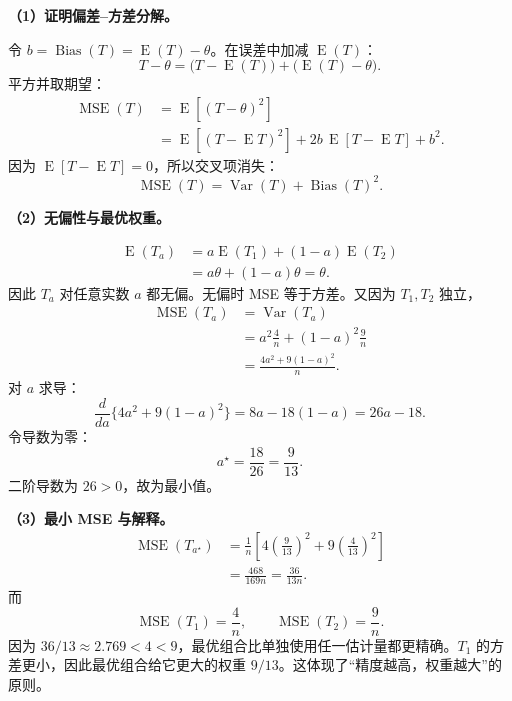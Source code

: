\documentclass[11pt,a4paper]{article}
\newcommand{\E}{\operatorname{E}}
\newcommand{\Var}{\operatorname{Var}}
\newcommand{\Bias}{\operatorname{Bias}}
\newcommand{\MSE}{\operatorname{MSE}}
\begin{document}
\begin{solutionbox}
\textbf{（1）证明偏差--方差分解。}

令 $b=\Bias(T)=\E(T)-\theta$。在误差中加减 $\E(T)$：
\[
  T-\theta
  =
  \bigl(T-\E(T)\bigr)
  +
  \bigl(\E(T)-\theta\bigr).
\]
平方并取期望：
\[
\begin{aligned}
  \MSE(T)
  &=
  \E[(T-\theta)^2]\\
  &=
  \E[(T-\E T)^2]
  +2b\,\E[T-\E T]
  +b^2.
\end{aligned}
\]
因为 $\E[T-\E T]=0$，所以交叉项消失：
\[
  \boxed{\MSE(T)=\Var(T)+\Bias(T)^2.}
\]

\textbf{（2）无偏性与最优权重。}

\[
\begin{aligned}
  \E(T_a)
  &=
  a\E(T_1)+(1-a)\E(T_2)\\
  &=
  a\theta+(1-a)\theta
  =
  \theta.
\end{aligned}
\]
因此 $T_a$ 对任意实数 $a$ 都无偏。无偏时 MSE 等于方差。又因为 $T_1,T_2$ 独立，
\[
\begin{aligned}
  \MSE(T_a)
  &=
  \Var(T_a)\\
  &=
  a^2\frac4n+(1-a)^2\frac9n\\
  &=
  \frac{4a^2+9(1-a)^2}{n}.
\end{aligned}
\]
对 $a$ 求导：
\[
  \frac{d}{da}\{4a^2+9(1-a)^2\}
  =
  8a-18(1-a)
  =
  26a-18.
\]
令导数为零：
\[
  \boxed{a^\star=\frac{18}{26}=\frac9{13}.}
\]
二阶导数为 $26>0$，故为最小值。

\textbf{（3）最小 MSE 与解释。}
\[
\begin{aligned}
  \MSE(T_{a^\star})
  &=
  \frac1n\left[
  4\left(\frac9{13}\right)^2
  +
  9\left(\frac4{13}\right)^2
  \right]\\
  &=
  \frac{468}{169n}
  =
  \boxed{\frac{36}{13n}}.
\end{aligned}
\]
而
\[
  \MSE(T_1)=\frac4n,
  \qquad
  \MSE(T_2)=\frac9n.
\]
因为 $36/13\approx2.769<4<9$，最优组合比单独使用任一估计量都更精确。$T_1$ 的方差更小，因此最优组合给它更大的权重 $9/13$。这体现了“精度越高，权重越大”的原则。
\end{solutionbox}
\end{document}
